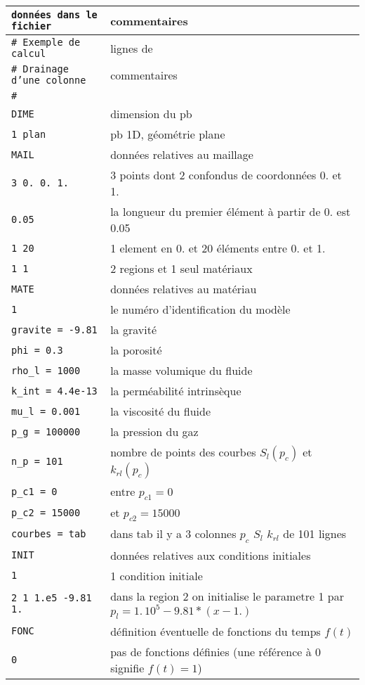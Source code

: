 \documentclass[a4paper,11pt]{article}
\begin{document}
\begin{table}
\footnotesize
\begin{center}
\begin{tabular}{>{\tt}ll}
donn\'ees dans le fichier & commentaires\\ \hline
\# Exemple de calcul & lignes de\\
\# Drainage d'une colonne & commentaires\\
\# &\\
DIME & dimension du pb\\
1 plan   & pb 1D, g\'eom\'etrie plane\\
MAIL & donn\'ees relatives au maillage\\
3 0. 0. 1. & 3 points dont 2 confondus de coordonn\'ees 0. et 1.\\
0.05 & la longueur du premier \'el\'ement \`a partir de 0. est 0.05\\
1 20  & 1 element en 0. et 20 \'el\'ements entre 0. et 1.\\
1 1  & 2 regions et 1 seul mat\'eriaux\\
MATE & donn\'ees relatives au mat\'eriau\\
1 & le num\'ero d'identification du mod\`ele\\
gravite = -9.81 & la gravit\'e\\
phi = 0.3 & la porosit\'e\\
rho\_l = 1000 & la masse volumique du fluide\\
k\_int = 4.4e-13 & la perm\'eabilit\'e intrins\`eque\\
mu\_l = 0.001 & la viscosit\'e du fluide\\
p\_g = 100000 & la pression du gaz\\
n\_p = 101 & nombre de points des courbes $S_l(p_c)$ et $k_{rl}(p_c)$\\
p\_c1 = 0 & entre $p_{c1}=0$\\
p\_c2 = 15000 & et $p_{c2}=15000$\\
courbes = tab & dans tab il y a 3 colonnes $p_c$ $S_l$ $k_{rl}$ de 101 lignes\\
INIT & donn\'ees relatives aux conditions initiales\\
1 & 1 condition initiale\\
2 1 1.e5 -9.81 1. & dans la region 2 on initialise le parametre 1 par $p_l=1.\,10^5-9.81*(x-1.)$\\
FONC & d\'efinition \'eventuelle de fonctions du temps $f(t)$\\
0 & pas de fonctions d\'efinies (une r\'ef\'erence \`a 0 signifie $f(t)=1$)\\

\end{tabular}
\end{center}
\end{table}
\end{document}
